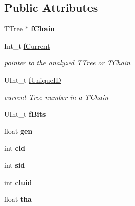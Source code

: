 \subsection*{Public Attributes}
\begin{DoxyCompactItemize}
\item 
\mbox{\label{classg__clx_a130d1bf27b8d3e663d2b27ade478ae0b}} 
T\+Tree $\ast$ {\bfseries f\+Chain}
\item 
\mbox{\label{classg__clx_a4ebe765901e5abf5d740a59edd2796d3}} 
Int\+\_\+t \hyperlink{classg__clx_a4ebe765901e5abf5d740a59edd2796d3}{f\+Current}
\begin{DoxyCompactList}\small\item\em pointer to the analyzed T\+Tree or T\+Chain \end{DoxyCompactList}\item 
\mbox{\label{classg__clx_abf3f260c2d2f9884a9f6b041f54ec94a}} 
U\+Int\+\_\+t \hyperlink{classg__clx_abf3f260c2d2f9884a9f6b041f54ec94a}{f\+Unique\+ID}
\begin{DoxyCompactList}\small\item\em current Tree number in a T\+Chain \end{DoxyCompactList}\item 
\mbox{\label{classg__clx_a7206bd09efca58552eea94544746280e}} 
U\+Int\+\_\+t {\bfseries f\+Bits}
\item 
\mbox{\label{classg__clx_afa1d8a83322f5f91c433b1747ffdc71b}} 
float {\bfseries gen}
\item 
\mbox{\label{classg__clx_a0cc2a584a4f5152751778ee68bcdb743}} 
int {\bfseries cid}
\item 
\mbox{\label{classg__clx_a04f33012ec56804fca6978885732bc8f}} 
int {\bfseries sid}
\item 
\mbox{\label{classg__clx_af057b9309517174aa3f45d0357b594e0}} 
int {\bfseries cluid}
\item 
\mbox{\label{classg__clx_a1add23d784b2694a2f680b855480d95f}} 
float {\bfseries tha}
\item 
\mbox{\label{classg__clx_affd7b8c1191e11bab79d77dfb4f16a63}} 

\end{DoxyCompactItemize}
